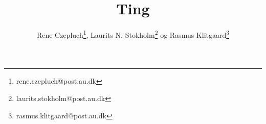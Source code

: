 \documentclass[danish,a4paper,twocolumn, oneside]{memoir}
\title{Ting}
\author{Rene Czepluch\thanks{rene.czepluch@post.au.dk}, Laurits N. Stokholm\thanks{laurits.stokholm@post.au.dk} og Rasmus Klitgaard\thanks{rasmus.klitgaard@post.au.dk}}
\date{}
\begin{document}
\maketitle
\noindent







\end{document}
